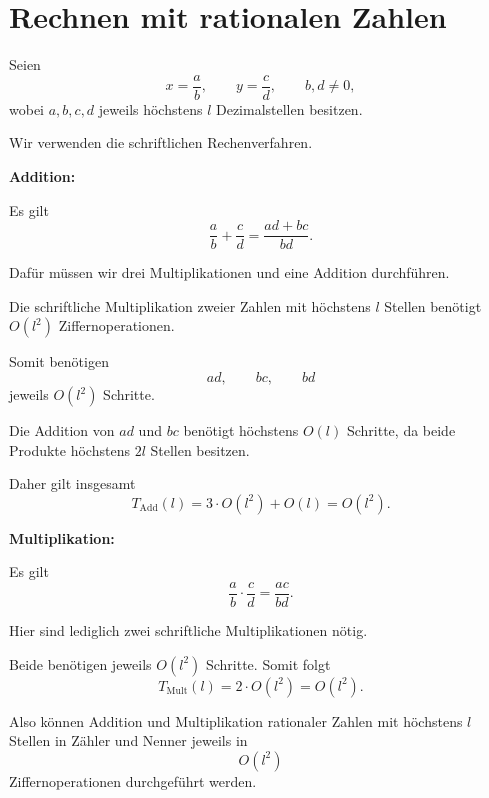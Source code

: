 \documentclass{report}
\begin{document}
\section{Rechnen mit rationalen Zahlen}


\begin{myproof}
  Seien
  \[
    x=\frac ab,
    \qquad
    y=\frac cd,
    \qquad b,d\ne0,
  \]
  wobei $a,b,c,d$ jeweils höchstens $l$
  Dezimalstellen besitzen.

  Wir verwenden die schriftlichen
  Rechenverfahren.

  \medskip
  \textbf{Addition:}

  Es gilt
  \[
    \frac ab+\frac cd
    =\frac{ad+bc}{bd}.
  \]

  Dafür müssen wir drei Multiplikationen
  und eine Addition durchführen.

  Die schriftliche Multiplikation zweier
  Zahlen mit höchstens $l$ Stellen benötigt
  $O(l^2)$ Ziffernoperationen.

  Somit benötigen
  \[
    ad,\qquad bc,\qquad bd
  \]
  jeweils $O(l^2)$ Schritte.

  Die Addition von $ad$ und $bc$ benötigt
  höchstens $O(l)$ Schritte, da beide Produkte
  höchstens $2l$ Stellen besitzen.

  Daher gilt insgesamt
  \[
    T_{\mathrm{Add}}(l)
    =3\cdot O(l^2)+O(l)
    =O(l^2).
  \]

  \medskip
  \textbf{Multiplikation:}

  Es gilt
  \[
    \frac ab\cdot\frac cd
    =\frac{ac}{bd}.
  \]

  Hier sind lediglich zwei schriftliche
  Multiplikationen nötig.

  Beide benötigen jeweils $O(l^2)$ Schritte.
  Somit folgt
  \[
    T_{\mathrm{Mult}}(l)
    =2\cdot O(l^2)
    =O(l^2).
  \]

  Also können Addition und Multiplikation
  rationaler Zahlen mit höchstens $l$ Stellen
  in Zähler und Nenner jeweils in
  \[
    \boxed{O(l^2)}
  \]
  Ziffernoperationen durchgeführt werden.
\end{myproof}

\end{document}
